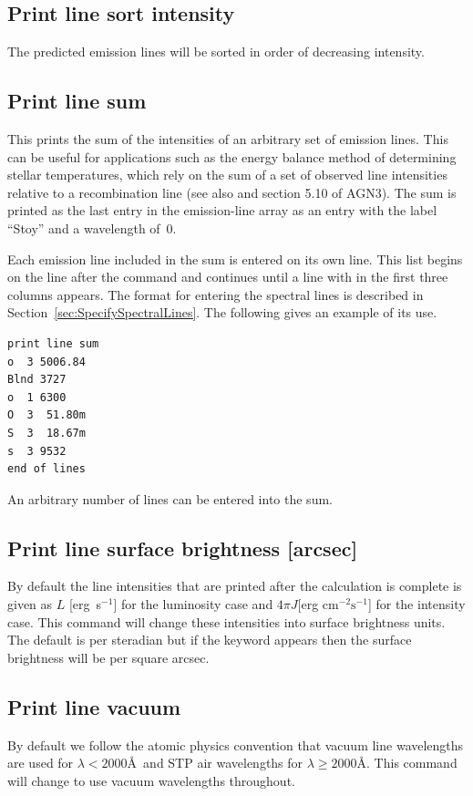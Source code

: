 \subsection{Print line sort intensity}

The predicted emission lines will be sorted in order of decreasing
intensity.

\subsection{Print line sum}

This prints the sum of the intensities of an arbitrary set of emission
lines.
This can be useful for applications such as the \citet{Stoy1933} energy
balance method of determining stellar temperatures, which rely on the sum
of a set of observed line intensities relative to a recombination line (see also \citealp{Kaler1991} and section 5.10 of AGN3).
The sum is printed
as the last entry in the emission-line array as an entry with the label
``Stoy'' and a wavelength of~0.

Each emission line included in the sum is entered on its own line.  This
list begins on the line after the  command and continues until
a line with  in the first three columns appears.
The format for entering the spectral lines is described in Section~\ref{sec:SpecifySpectralLines}.
The following gives
an example of its use.
\begin{verbatim}
print line sum
o  3 5006.84
Blnd 3727
o  1 6300
O  3  51.80m
S  3  18.67m
s  3 9532
end of lines
\end{verbatim}

An arbitrary number of lines can be entered into the sum.

\subsection{Print line surface brightness [arcsec]}
\label{sec:CommandPrintLineSurfaceBrightness}

By default the line intensities that are printed after the calculation
is complete is given as $L$ [erg~s$^{-1}$] for the luminosity case and
$4\pi J$[erg cm$^{-2} \mathrm{s}^{-1}$] for the intensity case.
This command will change these
intensities into surface brightness units.
The default is per steradian
but if the keyword  appears then the surface brightness will be per square arcsec.

\subsection{Print line vacuum}
\label{sec:CommandPrintVacuum}
By default we follow the atomic physics convention that vacuum line wavelengths are used
for $\lambda < 2000$\AA\ and STP air wavelengths for $\lambda \ge 2000$\AA.
This command will change to use vacuum wavelengths throughout.

